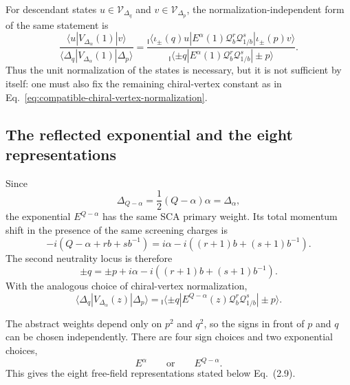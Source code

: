 \documentclass[11pt]{article}
\newcommand{\Ibra}[1]{{}_{\mathsf I}\!\langle #1|}
\begin{document}
For descendant states \(u\in\mathcal V_{\Delta_q}\) and
\(v\in\mathcal V_{\Delta_p}\), the normalization-independent form of the
same statement is
\begin{equation}
 \boxed{
 \frac{
  \langle u|V_{\Delta_\alpha}(1)|v\rangle
 }{
  \langle\Delta_q|V_{\Delta_\alpha}(1)|\Delta_p\rangle
 }
 =
 \frac{
  \Ibra{\iota_\pm(q)u}
  E^\alpha(1)\mathcal Q_b^r\mathcal Q_{1/b}^s
  |\iota_\pm(p)v\rangle
 }{
  \Ibra{\pm q}
  E^\alpha(1)\mathcal Q_b^r\mathcal Q_{1/b}^s
  |\pm p\rangle
 }
 }.
 \label{eq:normalized-screened-Ward-identity}
\end{equation}
Thus the unit normalization of the states is necessary, but it is not
sufficient by itself: one must also fix the remaining chiral-vertex constant
as in Eq.~\eqref{eq:compatible-chiral-vertex-normalization}.

\subsection{The reflected exponential and the eight representations}

Since
\begin{equation}
 \Delta_{Q-\alpha}
 =
 \frac12(Q-\alpha)\alpha
 =
 \Delta_\alpha,
 \label{eq:reflected-alpha-weight}
\end{equation}
the exponential \(E^{Q-\alpha}\) has the same SCA primary weight.  Its total
momentum shift in the presence of the same screening charges is
\begin{equation}
 -i\left(Q-\alpha+rb+sb^{-1}\right)
 =
 i\alpha-i\left((r+1)b+(s+1)b^{-1}\right).
 \label{eq:second-total-momentum-shift}
\end{equation}
The second neutrality locus is therefore
\begin{equation}
 \boxed{
 \pm q
 =
 \pm p+i\alpha
 -i\left((r+1)b+(s+1)b^{-1}\right)
 }.
 \label{eq:second-neutrality-condition}
\end{equation}
With the analogous choice of chiral-vertex normalization,
\begin{equation}
 \boxed{
 \langle\Delta_q|
 V_{\Delta_\alpha}(z)
 |\Delta_p\rangle
 =
 \Ibra{\pm q}
 E^{Q-\alpha}(z)\mathcal Q_b^r\mathcal Q_{1/b}^s
 |\pm p\rangle
 }.
 \label{eq:second-form-of-2.9}
\end{equation}

The abstract weights depend only on \(p^2\) and \(q^2\), so the signs in
front of \(p\) and \(q\) can be chosen independently.  There are four sign
choices and two exponential choices,
\begin{equation}
 E^\alpha
 \qquad\text{or}\qquad
 E^{Q-\alpha}.
\end{equation}
This gives the eight free-field representations stated below Eq.~(2.9).
\end{document}
